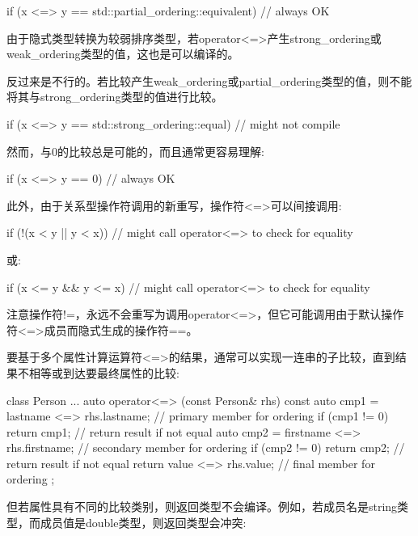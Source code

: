 \begin{cpp}
if (x <=> y == std::partial_ordering::equivalent) // always OK
\end{cpp}

由于隐式类型转换为较弱排序类型，若operator<=>产生strong\_ordering或weak\_ordering类型的值，这也是可以编译的。

反过来是不行的。若比较产生weak\_ordering或partial\_ordering类型的值，则不能将其与strong\_ordering类型的值进行比较。

\begin{cpp}
if (x <=> y == std::strong_ordering::equal) // might not compile
\end{cpp}

然而，与0的比较总是可能的，而且通常更容易理解:

\begin{cpp}
if (x <=> y == 0) // always OK
\end{cpp}

此外，由于关系型操作符调用的新重写，操作符<=>可以间接调用:

\begin{cpp}
if (!(x < y || y < x)) // might call operator<=> to check for equality
\end{cpp}

或:

\begin{cpp}
if (x <= y && y <= x) // might call operator<=> to check for equality
\end{cpp}

注意操作符!=，永远不会重写为调用operator<=>，但它可能调用由于默认操作符<=>成员而隐式生成的操作符==。


要基于多个属性计算运算符<=>的结果，通常可以实现一连串的子比较，直到结果不相等或到达要最终属性的比较:

\begin{cpp}
class Person {
	...
	auto operator<=> (const Person& rhs) const {
		auto cmp1 = lastname <=> rhs.lastname; // primary member for ordering
		if (cmp1 != 0) return cmp1; // return result if not equal
		auto cmp2 = firstname <=> rhs.firstname; // secondary member for ordering
		if (cmp2 != 0) return cmp2; // return result if not equal
		return value <=> rhs.value; // final member for ordering
	}
};
\end{cpp}

但若属性具有不同的比较类别，则返回类型不会编译。例如，若成员名是string类型，而成员值是double类型，则返回类型会冲突:

